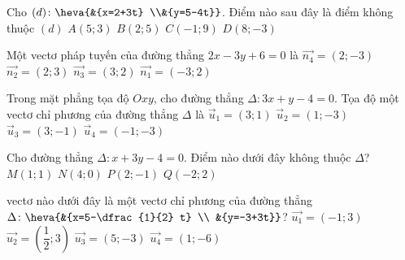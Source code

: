\begin{ex}%
	Cho  $(d)\colon \heva{&{x=2+3t} \\&{y=5-4t}}$. Điểm nào sau đây là điểm không thuộc $(d)$
	\choice 
		{$A(5;3)$} 
		{\True $B(2;5)$} 
		{$C(-1;  9)$}
		{$D(8;-3)$} 
\end{ex}

\begin{ex}%
	Một vectơ pháp  tuyến của đường thẳng $2x-3y+6=0$ là
	\choice 
		 {\True $\overrightarrow{n_4}=\left(2;-3\right)$}
		 {$\overrightarrow{n_2}=\left(2; 3\right)$}
		 {$\overrightarrow{n_3}=\left(3; 2\right)$}
		{$\overrightarrow{n_1}=\left(-3;  2\right)$}
\end{ex}

\begin{ex}%
	Trong mặt phẳng tọa  độ $Oxy$, cho đường thẳng $\Delta\colon 3x+y-4=0$. Tọa độ một vectơ chỉ phương của đường thẳng $\Delta$ là
	 \choice
		{$\overrightarrow{u}_1=(3; 1)$} 
		 {\True $\overrightarrow{u}_2=(1;-3)$}
		{$\overrightarrow{u}_3=(3;-1)$} 
		 {$\overrightarrow{u}_4=(-1;-3)$}
\end{ex}

\begin{ex}%
	Cho đường thẳng $\Delta\colon x+3y-4=0$. Điểm  nào dưới đây không thuộc $\Delta$?\\
	\choice 
		 {$M(1;1)$}
		 {$N(4;0)$}
		 {\True $P(2;-1)$}
		 {$Q(-2;2)$}
\end{ex}

\begin{ex}%
	vectơ nào dưới đây là một vectơ chỉ phương của đường  thẳng $\Delta\colon \heva{&{x=5-\dfrac{1}{2} t} \\ &{y=-3+3t}}$?
	\choice 
		{$\overrightarrow{u_1}=\left(-1;3\right)$} 
		 {$\overrightarrow{u_2}=\left(\dfrac{1}{2};3\right)$}
		{$\overrightarrow{u_3}=\left(5;-3\right)$} 
		 {\True $\overrightarrow{u_4}=\left(1;-6\right)$}
\end{ex}


